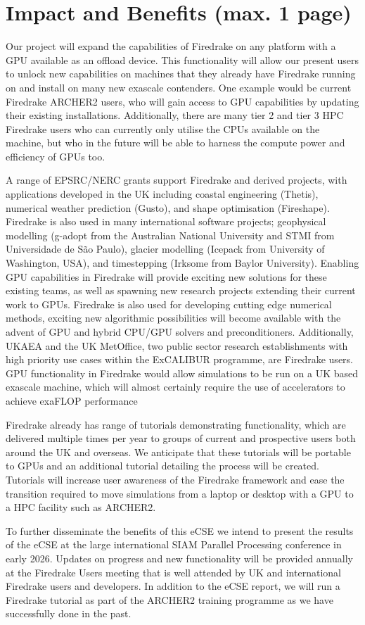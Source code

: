 \documentclass[a4paper,11pt]{article}
\begin{document}
\clearpage
\section{Impact and Benefits (max. 1 page)}
Our project will expand the capabilities of Firedrake on any platform with a GPU available as an offload device.
This functionality will allow our present users to unlock new capabilities on machines that they already have Firedrake running on and install on many new exascale contenders.
One example would be current Firedrake ARCHER2 users, who will gain access to GPU capabilities by updating their existing installations.
Additionally, there are many tier 2 and tier 3 HPC Firedrake users who can currently only utilise the CPUs available on the machine, but who in the future will be able to harness the compute power and efficiency of GPUs too. 

A range of EPSRC/NERC grants support Firedrake and derived projects, with applications developed in the UK including coastal engineering (Thetis), numerical weather prediction (Gusto), and shape optimisation (Fireshape).
Firedrake is also used in many international software projects; geophysical modelling (g-adopt from the Australian National University and STMI from Universidade de São Paulo), glacier modelling (Icepack from University of Washington, USA), and timestepping (Irksome from Baylor University).
Enabling GPU capabilities in Firedrake will provide exciting new solutions for these existing teams, as well as spawning new research projects extending their current work to GPUs.
Firedrake is also used for developing cutting edge numerical methods, exciting new algorithmic possibilities will become available with the advent of GPU and hybrid CPU/GPU solvers and preconditioners.
Additionally, UKAEA and the UK MetOffice, two public sector research establishments with high priority use cases within the ExCALIBUR programme, are Firedrake users.
GPU functionality in Firedrake would allow simulations to be run on a UK based exascale machine, which will almost certainly require the use of accelerators to achieve exaFLOP performance

Firedrake already has range of tutorials demonstrating functionality, which are delivered multiple times per year to groups of current and prospective users both around the UK and overseas.
We anticipate that these tutorials will be portable to GPUs and an additional tutorial detailing the process will be created.
Tutorials will increase user awareness of the Firedrake framework and ease the transition required to move simulations from a laptop or desktop with a GPU to a HPC facility such as ARCHER2.

To further disseminate the benefits of this eCSE we intend to present the results of the eCSE at the large international SIAM Parallel Processing conference in early 2026.
Updates on progress and new functionality will be provided annually at the Firedrake Users meeting that is well attended by UK and international Firedrake users and developers.
In addition to the eCSE report, we will run a Firedrake tutorial as part of the ARCHER2 training programme as we have successfully done in the past. 
\end{document}
